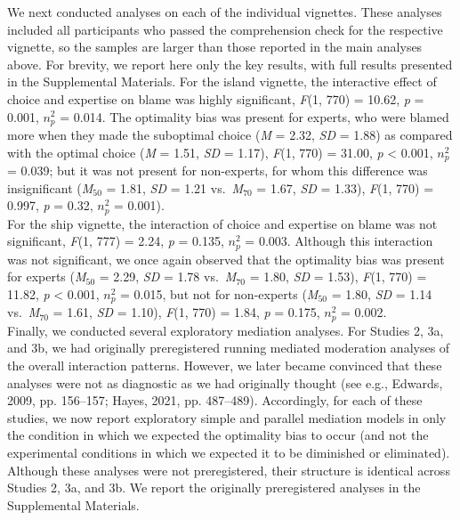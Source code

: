 \documentclass[
  man,floatsintext]{apa6}
\begin{document}
We next conducted analyses on each of the individual vignettes. These analyses included all participants who passed the comprehension check for the respective vignette, so the samples are larger than those reported in the main analyses above. For brevity, we report here only the key results, with full results presented in the Supplemental Materials. For the island vignette, the interactive effect of choice and expertise on blame was highly significant, \emph{F}(1, 770) = 10.62, \emph{p} = 0.001, \(n^2_p\) = 0.014. The optimality bias was present for experts, who were blamed more when they made the suboptimal choice (\emph{M} = 2.32, \emph{SD} = 1.88) as compared with the optimal choice (\emph{M} = 1.51, \emph{SD} = 1.17), \emph{F}(1, 770) = 31.00, \emph{p} \textless{} 0.001, \(n^2_p\) = 0.039; but it was not present for non-experts, for whom this difference was insignificant (\emph{M}\(_{50}\) = 1.81, \emph{SD} = 1.21 vs.~\emph{M}\(_{70}\) = 1.67, \emph{SD} = 1.33), \emph{F}(1, 770) = 0.997, \emph{p} = 0.32, \(n^2_p\) = 0.001).\\
For the ship vignette, the interaction of choice and expertise on blame was not significant, \emph{F}(1, 777) = 2.24, \emph{p} = 0.135, \(n^2_p\) = 0.003. Although this interaction was not significant, we once again observed that the optimality bias was present for experts (\emph{M}\(_{50}\) = 2.29, \emph{SD} = 1.78 vs.~\emph{M}\(_{70}\) = 1.80, \emph{SD} = 1.53), \emph{F}(1, 770) = 11.82, \emph{p} \textless{} 0.001, \(n^2_p\) = 0.015, but not for non-experts (\emph{M}\(_{50}\) = 1.80, \emph{SD} = 1.14 vs.~\emph{M}\(_{70}\) = 1.61, \emph{SD} = 1.10), \emph{F}(1, 770) = 1.84, \emph{p} = 0.175, \(n^2_p\) = 0.002.\\
Finally, we conducted several exploratory mediation analyses. For Studies 2, 3a, and 3b, we had originally preregistered running mediated moderation analyses of the overall interaction patterns. However, we later became convinced that these analyses were not as diagnostic as we had originally thought (see e.g., Edwards, 2009, pp. 156--157; Hayes, 2021, pp. 487--489). Accordingly, for each of these studies, we now report exploratory simple and parallel mediation models in only the condition in which we expected the optimality bias to occur (and not the experimental conditions in which we expected it to be diminished or eliminated). Although these analyses were not preregistered, their structure is identical across Studies 2, 3a, and 3b. We report the originally preregistered analyses in the Supplemental Materials.\\
\end{document}
